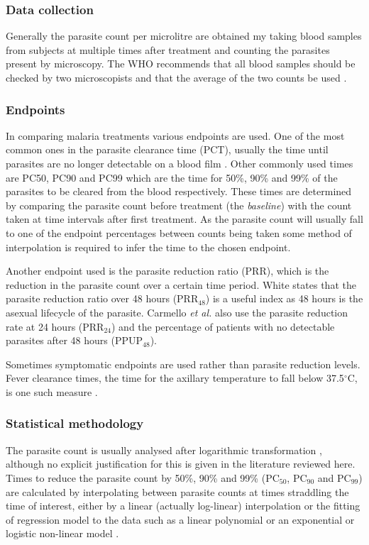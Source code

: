 \subsubsection*{Data collection}
Generally the parasite count per microlitre are obtained my taking blood samples from subjects at multiple times after treatment and counting the parasites present by microscopy. The WHO recommends that all blood samples should be checked by two microscopists and that the average of the two counts be used \cite{protocolWHO}.

\subsubsection*{Endpoints}
In comparing malaria treatments various endpoints are used. One of the most common ones in the parasite clearance time (PCT), usually the time until parasites are no longer detectable on a blood film \cite{white}. Other commonly used times are PC50, PC90 and PC99 which are the time for 50\%, 90\% and 99\% of the parasites to be cleared from the blood respectively. These times are determined by comparing the parasite count before treatment (the \textit{baseline}) with the count taken at time intervals after first treatment. As the parasite count will usually fall to one of the endpoint percentages between counts being taken some method of interpolation is required to infer the time to the chosen endpoint.

Another endpoint used is the parasite reduction ratio (PRR), which is the reduction in the parasite count over a certain time period. White \cite{white} states that the parasite reduction ratio over 48 hours (PRR$_{48}$) is a useful index as 48 hours is the asexual lifecycle of the parasite. Carmello \textit{et al.} \cite{carmello} also use the parasite reduction rate at 24 hours (PRR$_{24}$) and the percentage of patients with no detectable parasites after 48 hours (PPUP$_{48}$).

Sometimes symptomatic endpoints are used rather than parasite reduction levels.  Fever clearance times, the time for the axillary temperature to fall below 37.5$^\circ$C, is one such measure \cite{bell,newton}.

\subsubsection*{Statistical methodology}
The parasite count is usually analysed after logarithmic transformation \cite{wootton, vries, carmello}, although no explicit justification for this is given in the literature reviewed here. Times to reduce the parasite count by 50\%, 90\% and 99\% (PC$_{50}$, PC$_{90}$ and PC$_{99}$) are calculated by interpolating between parasite counts at times straddling the time of interest, either by a linear (actually log-linear) interpolation \cite{carmello, newton} or the fitting of regression model to the data such as a linear polynomial \cite{vries} or an exponential \cite{vries} or logistic non-linear model \cite{wootton}.

